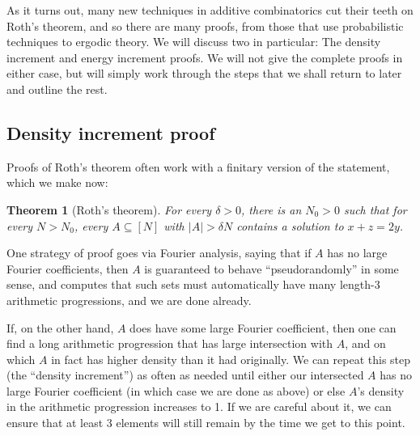 \documentclass{report}
\newtheorem{theorem}{Theorem}[section]
\theoremstyle{remark}
\numberwithin{equation}{section}
\begin{document}
As it turns out, many new techniques in additive combinatorics cut
their teeth on Roth's theorem, and so there are many proofs, from
those that use probabilistic techniques to ergodic theory.  We will
discuss two in particular: The density increment and energy increment
proofs.  We will not give the complete proofs in either case, but will
simply work through the steps that we shall return to later and
outline the rest.

\subsection{Density increment proof}

Proofs of Roth's theorem often work with a finitary version of the
statement, which we make now:

\begin{theorem}[Roth's theorem]
  For every $\delta > 0$, there is an $N_0 > 0$ such that for every
  $N > N_0$, every $A \subseteq [N]$ with $|A| > \delta N$ contains a
  solution to $x+z=2y$.
\end{theorem}

One strategy of proof goes via Fourier analysis, saying that if $A$
has no large Fourier coefficients, then $A$ is guaranteed to behave
``pseudorandomly'' in some sense, and computes that such sets must
automatically have many length-3 arithmetic progressions, and we are
done already.  

If, on the other hand, $A$ does have some large Fourier coefficient,
then one can find a long arithmetic progression that has large
intersection with $A$, and on which $A$ in fact has higher density
than it had originally.  We can repeat this step (the ``density
increment'') as often as needed until either our intersected $A$ has
no large Fourier coefficient (in which case we are done as above) or
else $A$'s density in the arithmetic progression increases to 1.  If
we are careful about it, we can ensure that at least 3 elements will
still remain by the time we get to this point.
\end{document}
